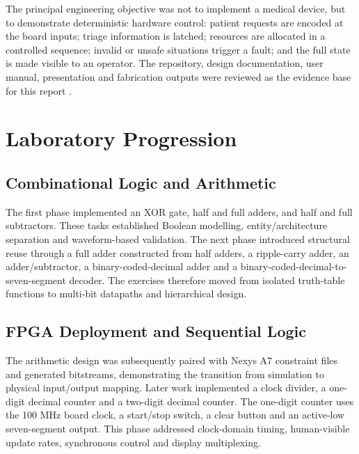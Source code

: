 \documentclass[conference]{IEEEtran}
\begin{document}
The principal engineering objective was not to implement a medical device, but to demonstrate deterministic hardware control: patient requests are encoded at the board inputs; triage information is latched; resources are allocated in a controlled sequence; invalid or unsafe situations trigger a fault; and the full state is made visible to an operator. The repository, design documentation, user manual, presentation and fabrication outputs were reviewed as the evidence base for this report \cite{repo,manual,concept}.

\section{Laboratory Progression}
\subsection{Combinational Logic and Arithmetic}
The first phase implemented an XOR gate, half and full adders, and half and full subtractors. These tasks established Boolean modelling, entity/architecture separation and waveform-based validation. The next phase introduced structural reuse through a full adder constructed from half adders, a ripple-carry adder, an adder/subtractor, a binary-coded-decimal adder and a binary-coded-decimal-to-seven-segment decoder. The exercises therefore moved from isolated truth-table functions to multi-bit datapaths and hierarchical design.

\subsection{FPGA Deployment and Sequential Logic}
The arithmetic design was subsequently paired with Nexys A7 constraint files and generated bitstreams, demonstrating the transition from simulation to physical input/output mapping. Later work implemented a clock divider, a one-digit decimal counter and a two-digit decimal counter. The one-digit counter uses the 100 MHz board clock, a start/stop switch, a clear button and an active-low seven-segment output. This phase addressed clock-domain timing, human-visible update rates, synchronous control and display multiplexing.
\end{document}
